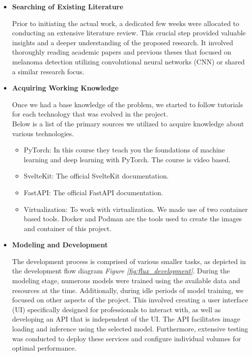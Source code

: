 \begin{itemize}
  \item{\textbf{Searching of Existing Literature}}

    Prior to initiating the actual work, a dedicated few weeks were allocated
    to conducting an extensive literature review. This crucial step provided
    valuable insights and a deeper understanding of the proposed research. It
    involved thoroughly reading academic papers and previous theses that
    focused on melanoma detection utilizing convolutional neural networks (CNN)
    or shared a similar research focus.

  \item{\textbf{Acquiring Working Knowledge}}

    Once we had a base knowledge of the problem, we started to follow tutorials
    for each technology that was evolved in the project. \\

    Below is a list of the primary sources we utilized to acquire knowledge
    about various technologies.

    \begin{itemize}
      \item PyTorch: \cite{LearnPyTorch} In this course they teach you the foundations of machine learning and deep learning with PyTorch. The course is video based.

      \item SvelteKit: \cite{LearnSvelteKit} The official SvelteKit documentation.

      \item FastAPI: \cite{LearnFastAPI} The official FastAPI documentation.

      \item Virtualization: To work with virtualization. We made use of two container based tools. Docker \cite{LearnDocker} and Podman \cite{LearnPodman} are the tools used to create the images and container of this project.
    \end{itemize}

  \item{\textbf{Modeling and Development}}

    The development process is comprised of various smaller tasks, as depicted
    in the development flow diagram \textit{Figure \ref{fig:flux_development}}.
    During the modeling stage, numerous models were trained using the available
    data and resources at the time. Additionally, during idle periods of model
    training, we focused on other aspects of the project. This involved
    creating a user interface (UI) specifically designed for professionals to
    interact with, as well as developing an API that is independent of the UI.
    The API facilitates image loading and inference using the selected model.
    Furthermore, extensive testing was conducted to deploy these services and
    configure individual volumes for optimal performance.


\end{itemize}
